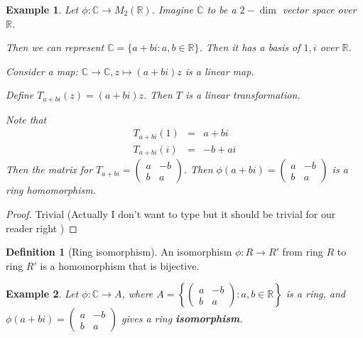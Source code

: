 \documentclass{article}
\theoremstyle{MyNonumberplain}
\theoremstyle{break}
\newtheorem*{proof}{Proof. }
\theoremstyle{break}
\newtheorem{example}{Example}[section]
\theoremstyle{break}
\theoremstyle{definition}
\theoremstyle{break}
\newtheorem{definition}{Definition}[section]
\begin{document}
\begin{expbox}
    \begin{example}
        Let $\phi : \mathbb{C} \rightarrow M_2 (\mathbb{R})$. Imagine $\mathbb{C}$ to
        be a $2 - \dim$ vector space over $\mathbb{R}$.\bigskip
        
        Then we can represent $\mathbb{C}= \{ a + b i : a, b \in \mathbb{R} \}$. Then
        it has a basis of $1, i$ over $\mathbb{R}$.\bigskip
        
        Consider a map: $\mathbb{C} \rightarrow \mathbb{C}, z \mapsto (a + b i) z$ is
        a linear map.\bigskip
        
        Define $T_{a + b i} (z) = (a + b i) z$. Then $T$ is a linear transformation.\bigskip
        
        Note that
        \begin{eqnarray*}
          T_{a + b i} (1) & = & a + b i\\
          T_{a + b i} (i) & = & - b + a i
        \end{eqnarray*}
        Then the matrix for $T_{a + b i} = \left(\begin{array}{cc}
          a & - b\\
          b & a
        \end{array}\right)$. Then $\phi (a + b i) = \left(\begin{array}{cc}
          a & - b\\
          b & a
        \end{array}\right)$ is a ring homomorphism.
    \end{example}
    \begin{prfbox}
        \begin{proof}
            Trivial (Actually I don't want to type but it should be trivial for our reader right )
        \end{proof}
    \end{prfbox}
\end{expbox}

\begin{defbox}
    \begin{definition}[Ring isomorphism]
        An isomorphism $\phi : R \rightarrow R'$ from ring $R$ to ring $R'$ is a
        homomorphism that is bijective.
    \end{definition}
\end{defbox}

\begin{expbox}
    \begin{example}
        Let $\phi : \mathbb{C} \rightarrow A$, where $A = \left\{
            \left(\begin{array}{cc}
              a & - b\\
              b & a
            \end{array}\right) : a, b \in \mathbb{R} \right\}$ is a ring, and $\phi (a + b i) = \left(\begin{array}{cc}
    a & - b\\
    b & a
\end{array}\right)$ gives a ring \textbf{isomorphism}.
    \end{example}
\end{expbox}
\end{document}
